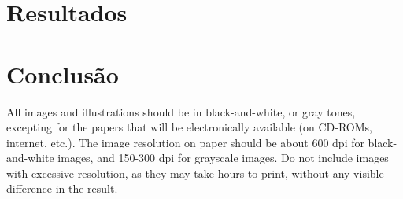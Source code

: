 \documentclass[12pt]{article}
\begin{document}
\section{Resultados}\label{sec:figs}


\section{Conclusão}

All images and illustrations should be in black-and-white, or gray tones,
excepting for the papers that will be electronically available (on CD-ROMs,
internet, etc.). The image resolution on paper should be about 600 dpi for
black-and-white images, and 150-300 dpi for grayscale images.  Do not include
images with excessive resolution, as they may take hours to print, without any
visible difference in the result. 



\end{document}
